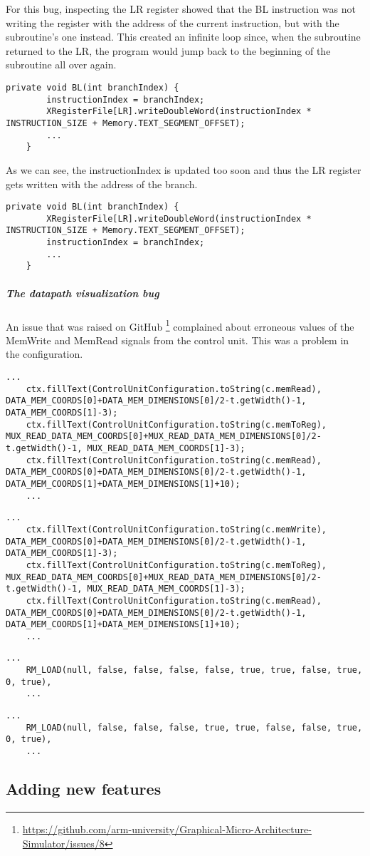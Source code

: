 For this bug, inspecting the LR register showed that the BL instruction was not writing the register with the address of the current instruction, but with the subroutine's one instead. This created an infinite loop since, when the subroutine returned to the LR, the program would jump back to the beginning of the subroutine all over again.
\begin{lstlisting}[caption={The buggy address writing}]
	private void BL(int branchIndex) {
		instructionIndex = branchIndex;
		XRegisterFile[LR].writeDoubleWord(instructionIndex * INSTRUCTION_SIZE + Memory.TEXT_SEGMENT_OFFSET);
		...
	}
\end{lstlisting}
As we can see, the instructionIndex is updated too soon and thus the LR register gets written with the address of the branch.
\begin{lstlisting}[caption={The fixed address writing}]
	private void BL(int branchIndex) {
		XRegisterFile[LR].writeDoubleWord(instructionIndex * INSTRUCTION_SIZE + Memory.TEXT_SEGMENT_OFFSET);
		instructionIndex = branchIndex;
		...
	}
\end{lstlisting}

\subparagraph*{The datapath visualization bug}
An issue that was raised on GitHub \footnote{\url{https://github.com/arm-university/Graphical-Micro-Architecture-Simulator/issues/8}} complained about erroneous values of the MemWrite and MemRead signals from the control unit. This was a problem in the configuration.
\begin{lstlisting}[caption={Buggy SingleCycleVis.java}]
	...
	ctx.fillText(ControlUnitConfiguration.toString(c.memRead), DATA_MEM_COORDS[0]+DATA_MEM_DIMENSIONS[0]/2-t.getWidth()-1, DATA_MEM_COORDS[1]-3);
	ctx.fillText(ControlUnitConfiguration.toString(c.memToReg), MUX_READ_DATA_MEM_COORDS[0]+MUX_READ_DATA_MEM_DIMENSIONS[0]/2-t.getWidth()-1, MUX_READ_DATA_MEM_COORDS[1]-3);
	ctx.fillText(ControlUnitConfiguration.toString(c.memRead), DATA_MEM_COORDS[0]+DATA_MEM_DIMENSIONS[0]/2-t.getWidth()-1, DATA_MEM_COORDS[1]+DATA_MEM_DIMENSIONS[1]+10);
	...
\end{lstlisting}
\begin{lstlisting}[caption={Fixed SingleCycleVis.java}]
	...
	ctx.fillText(ControlUnitConfiguration.toString(c.memWrite), DATA_MEM_COORDS[0]+DATA_MEM_DIMENSIONS[0]/2-t.getWidth()-1, DATA_MEM_COORDS[1]-3);
	ctx.fillText(ControlUnitConfiguration.toString(c.memToReg), MUX_READ_DATA_MEM_COORDS[0]+MUX_READ_DATA_MEM_DIMENSIONS[0]/2-t.getWidth()-1, MUX_READ_DATA_MEM_COORDS[1]-3);
	ctx.fillText(ControlUnitConfiguration.toString(c.memRead), DATA_MEM_COORDS[0]+DATA_MEM_DIMENSIONS[0]/2-t.getWidth()-1, DATA_MEM_COORDS[1]+DATA_MEM_DIMENSIONS[1]+10);
	...
\end{lstlisting}
\begin{lstlisting}[caption={BuggyControlUnitConfiguration.java}]
	...
	RM_LOAD(null, false, false, false, false, true, true, false, true, 0, true),
	...
\end{lstlisting}
\begin{lstlisting}[caption={Fixed ControlUnitConfiguration.java}]
	...
	RM_LOAD(null, false, false, false, true, true, false, false, true, 0, true),
	...
\end{lstlisting}

\subsection*{Adding new features}

